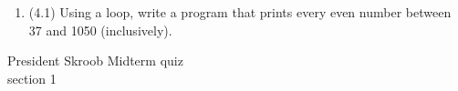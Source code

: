 \documentclass{article}
\begin{document}
\begin{enumerate}
\begin{minipage}{.45\textwidth}
		\end{minipage}











\item (4.1)  
		Using a loop, write a program that prints every even number 
		between 37 and 1050 (inclusively).


\end{enumerate}
\pagebreak
President Skroob \hfill Midterm quiz\\
section 1\\
\end{document}
